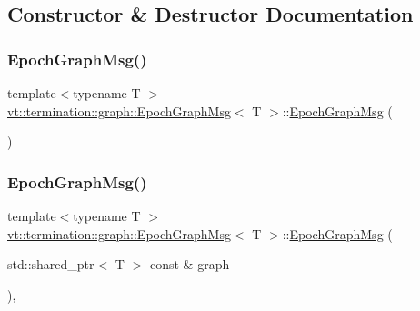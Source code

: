 \subsection{Constructor \& Destructor Documentation}
\mbox{\label{structvt_1_1termination_1_1graph_1_1_epoch_graph_msg_a7dd7c3313549d4d61f614bc1ec38a13b}} 
\subsubsection{\texorpdfstring{Epoch\+Graph\+Msg()}{EpochGraphMsg()}\hspace{0.1cm}{\footnotesize\ttfamily [1/2]}}
{\footnotesize\ttfamily template$<$typename T $>$ \\
\hyperlink{structvt_1_1termination_1_1graph_1_1_epoch_graph_msg}{vt\+::termination\+::graph\+::\+Epoch\+Graph\+Msg}$<$ T $>$\+::\hyperlink{structvt_1_1termination_1_1graph_1_1_epoch_graph_msg}{Epoch\+Graph\+Msg} (\begin{DoxyParamCaption}{ }\end{DoxyParamCaption})\hspace{0.3cm}{\ttfamily [default]}}

\mbox{\label{structvt_1_1termination_1_1graph_1_1_epoch_graph_msg_a3d594c68531bdbc1b114f4b52557d648}} 
\subsubsection{\texorpdfstring{Epoch\+Graph\+Msg()}{EpochGraphMsg()}\hspace{0.1cm}{\footnotesize\ttfamily [2/2]}}
{\footnotesize\ttfamily template$<$typename T $>$ \\
\hyperlink{structvt_1_1termination_1_1graph_1_1_epoch_graph_msg}{vt\+::termination\+::graph\+::\+Epoch\+Graph\+Msg}$<$ T $>$\+::\hyperlink{structvt_1_1termination_1_1graph_1_1_epoch_graph_msg}{Epoch\+Graph\+Msg} (\begin{DoxyParamCaption}\item[{std\+::shared\+\_\+ptr$<$ T $>$ const \&}]{graph }\end{DoxyParamCaption})\hspace{0.3cm}{\ttfamily [inline]}, {\ttfamily [explicit]}}



